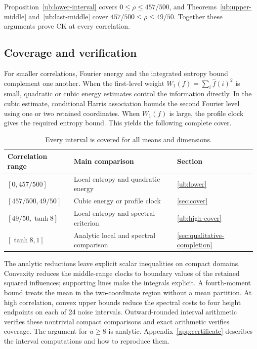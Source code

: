 \documentclass[11pt,letterpaper]{amsart}
\newcommand{\1}{\mathbf 1}
\numberwithin{equation}{section}
\begin{document}
Proposition~\ref{ub:lower-interval} covers
$0\le\rho\le457/500$, and
Theorems~\ref{ub:upper-middle} and~\ref{ub:last-middle}
cover $457/500\le\rho\le49/50$.
Together these arguments prove CK at every correlation.

\subsection{Coverage and verification}

For smaller correlations, Fourier energy and the integrated entropy
bound complement one another. When the first-level weight
$W_1(f)=\sum_i \widehat f(i)^2$ is small, quadratic or cubic energy estimates
control the information directly. In the cubic estimate, conditional
Harris association bounds the second Fourier level using one or two
retained coordinates. When $W_1(f)$ is large, the profile clock gives
the required entropy bound. This yields the following complete cover.

\begin{table}[htbp]\centering\normalsize
\begin{tabular}{@{}lll@{}}
\toprule
Correlation range & Main comparison & Section\\
\midrule
$[0,457/500]$ & Local entropy and quadratic energy & \ref{ub:lower}\\
$[457/500,49/50]$ & Cubic energy or profile clock & \ref{sec:cover}\\
$[49/50,\tanh8]$ & Local entropy and spectral criterion & \ref{ub:high-cover}\\
$[\tanh8,1]$ & Analytic local and spectral comparison & \ref{sec:qualitative-completion}\\
\bottomrule
\end{tabular}
\vspace*{3mm}
\caption{Every interval is covered for all means and dimensions.}
\end{table}

The analytic reductions leave explicit scalar inequalities on compact
domains. Convexity reduces the middle-range clocks to boundary values
of the retained squared influences; supporting lines make the integrals
explicit. A fourth-moment bound treats the mean in the two-coordinate
region without a mean partition. At high correlation, convex upper
bounds reduce the spectral costs to four height endpoints on each of
24 noise intervals. Outward-rounded interval arithmetic verifies these
nontrivial compact comparisons and exact arithmetic verifies coverage.
The argument for $u\ge8$ is analytic. Appendix~\ref{app:certificate}
describes the interval computations and how to reproduce them.
\end{document}
